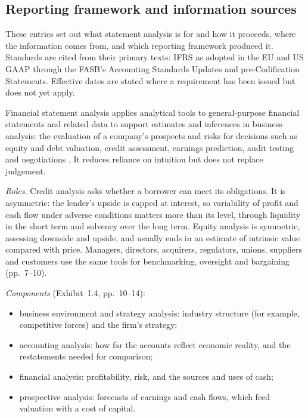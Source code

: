 \subsection{Reporting framework and information sources}

These entries set out what statement analysis is for and how it proceeds, where the information comes from, and which reporting framework produced it. Standards are cited from their primary texts: IFRS as adopted in the EU and US GAAP through the FASB's Accounting Standards Updates and pre-Codification Statements. Effective dates are stated where a requirement has been issued but does not yet apply.

\begin{qfdefinition}\label{def:statement-analysis-framework}
 Financial statement analysis applies analytical tools to general-purpose financial statements and related data to support estimates and inferences in business analysis: the evaluation of a company's prospects and risks for decisions such as equity and debt valuation, credit assessment, earnings prediction, audit testing and negotiations \citep[chap.~1, pp.~4--10]{financial-statement-analysis-2009}. It reduces reliance on intuition but does not replace judgement.

\emph{Roles.} Credit analysis asks whether a borrower can meet its obligations. It is asymmetric: the lender's upside is capped at interest, so variability of profit and cash flow under adverse conditions matters more than its level, through liquidity in the short term and solvency over the long term. Equity analysis is symmetric, assessing downside and upside, and usually ends in an estimate of intrinsic value compared with price. Managers, directors, acquirers, regulators, unions, suppliers and customers use the same tools for benchmarking, oversight and bargaining (pp.~7--10).

\emph{Components} (Exhibit~1.4, pp.~10--14):
\begin{itemize}
\item business environment and strategy analysis: industry structure (for example, competitive forces) and the firm's strategy;
\item accounting analysis: how far the accounts reflect economic reality, and the restatements needed for comparison;
\item financial analysis: profitability, risk, and the sources and uses of cash;
\item prospective analysis: forecasts of earnings and cash flows, which feed valuation with a cost of capital.
\end{itemize}


\end{qfdefinition}
